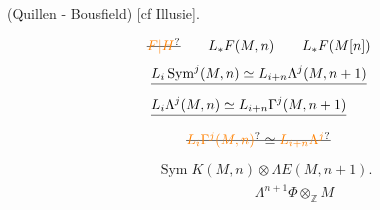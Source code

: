  (Quillen - Bousfield) [cf  Illusie].

\[
\deleted{\unsure{F|H}}\qquad L_{*}F(M,n)\qquad L_{*}F(M[n])
\]
\[
\begin{aligned}
&\deleted{L_i\operatorname{Sym}^{j}(M,n)\simeq L_{i+n}\Lambda^{j}(M,n+1)}\\
&\deleted{L_i\Lambda^{j}(M,n)\simeq L_{i+n}\Gamma^{j}(M,n+1)}
\end{aligned}
\]
\[
\deleted{\unsure{L_i\Gamma^{j}(M,n)}\simeq\unsure{L_{i+n}\Lambda^{j}}}
\]
\[
\begin{aligned}
&\operatorname{Sym} K(M,n)\otimes\Lambda E(M,n+1).\\
&\hspace{7em}\Lambda^{n+1}\Phi\otimes_{\mathbb Z}M
\end{aligned}
\]

